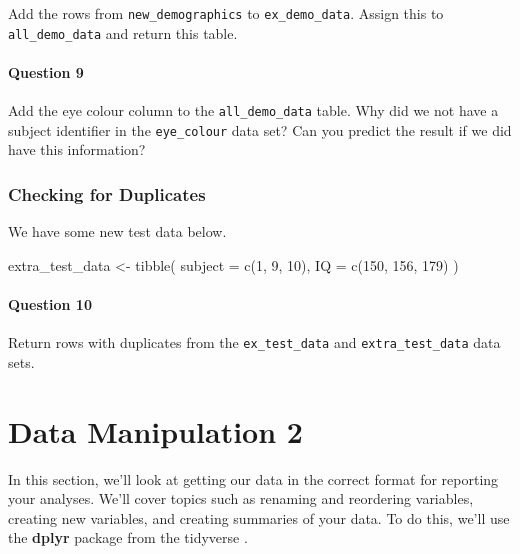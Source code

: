 \documentclass[
]{book}
\newenvironment{Shaded}{\begin{snugshade}}{\end{snugshade}}
\newcommand{\AttributeTok}[1]{\textcolor[rgb]{0.77,0.63,0.00}{#1}}
\newcommand{\DecValTok}[1]{\textcolor[rgb]{0.00,0.00,0.81}{#1}}
\newcommand{\FunctionTok}[1]{\textcolor[rgb]{0.00,0.00,0.00}{#1}}
\newcommand{\NormalTok}[1]{#1}
\newcommand{\OtherTok}[1]{\textcolor[rgb]{0.56,0.35,0.01}{#1}}
\begin{document}
Add the rows from \texttt{new\_demographics} to \texttt{ex\_demo\_data}. Assign this to \texttt{all\_demo\_data} and return this table.

\hypertarget{question-9-3}{%
\subsubsection{Question 9}\label{question-9-3}}

Add the eye colour column to the \texttt{all\_demo\_data} table. Why did we not have a subject identifier in the \texttt{eye\_colour} data set? Can you predict the result if we did have this information?

\hypertarget{checking-for-duplicates}{%
\subsection{Checking for Duplicates}\label{checking-for-duplicates}}

We have some new test data below.

\begin{Shaded}
\begin{Highlighting}[]
\NormalTok{extra\_test\_data }\OtherTok{\textless{}{-}} \FunctionTok{tibble}\NormalTok{(}
  \AttributeTok{subject =} \FunctionTok{c}\NormalTok{(}\DecValTok{1}\NormalTok{, }\DecValTok{9}\NormalTok{, }\DecValTok{10}\NormalTok{),}
  \AttributeTok{IQ =} \FunctionTok{c}\NormalTok{(}\DecValTok{150}\NormalTok{, }\DecValTok{156}\NormalTok{, }\DecValTok{179}\NormalTok{)}
\NormalTok{  )}
\end{Highlighting}
\end{Shaded}

\hypertarget{question-10-2}{%
\subsubsection{Question 10}\label{question-10-2}}

Return rows with duplicates from the \texttt{ex\_test\_data} and \texttt{extra\_test\_data} data sets.

\hypertarget{data-manipulation-2}{%
\chapter{Data Manipulation 2}\label{data-manipulation-2}}

In this section, we'll look at getting our data in the correct format for reporting your analyses. We'll cover topics such as renaming and reordering variables, creating new variables, and creating summaries of your data. To do this, we'll use the \textbf{dplyr} package \citep{R-dplyr} from the tidyverse \citep{R-tidyverse}.
\end{document}
